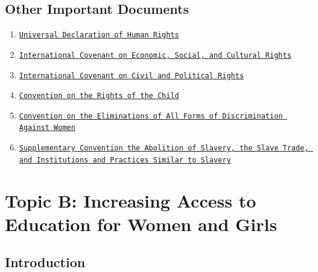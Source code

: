 \documentclass[10pt, letterpaper]{article}
\begin{document}
\subsection{Other Important Documents}

\begin{enumerate}
\def\labelenumi{\arabic{enumi}.}
\item
  
  \texttt{\href{https://www.un.org/en/universal-declaration-human-rights/}{{Universal
  Declaration of Human Rights}}}
  
\item
  
  \texttt{\href{https://www.ohchr.org/en/professionalinterest/pages/cescr.aspx}{{International
  Covenant on Economic, Social, and Cultural Rights}}}
  
\item
  
  \texttt{\href{https://www.ohchr.org/en/professionalinterest/pages/ccpr.aspx}{{International
  Covenant on Civil and Political Rights}}}
  
\item
  
  \texttt{\href{https://www.ohchr.org/en/professionalinterest/pages/crc.aspx}{{Convention
  on the Rights of the Child}}}
  
\item
  
  \texttt{\href{https://www.ohchr.org/en/professionalinterest/pages/cedaw.aspx}{{Convention
  on the Eliminations of All Forms of Discrimination Against Women}}}
  
\item
  
  \texttt{\href{https://www.ohchr.org/en/professionalinterest/pages/supplementaryconventionabolitionofslavery.aspx}{{Supplementary
  Convention the Abolition of Slavery, the Slave Trade, and
  Institutions and Practices Similar to Slavery}}}
  
\end{enumerate}

\newpage
\section{Topic B: Increasing Access to Education for Women and Girls}

\subsection{Introduction}
\end{document}

